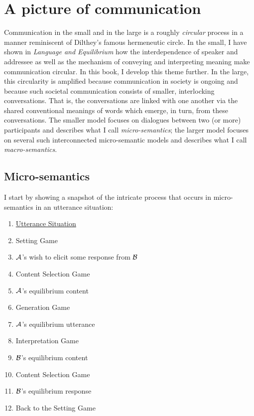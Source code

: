 \chapter{A picture of communication} \label{ch:picture of communication}

Communication in the small and in the large is a roughly \emph{circular} process in a manner reminiscent of Dilthey's famous hermeneutic circle. In the small, I have shown in \emph{Language and Equilibrium} how the interdependence of speaker and addressee as well as the mechanism of conveying and interpreting meaning make communication circular. In this book, I develop this theme further. In the large, this circularity is amplified because communication in society is ongoing and because such societal communication consists of smaller, interlocking conversations. That is, the conversations are linked with one another via the shared conventional meanings of words which emerge, in turn, from these conversations. The smaller model focuses on dialogues between two (or more) participants and describes what I call \emph{micro-semantics}; the larger model focuses on several such interconnected micro-semantic models and describes what I call \emph{macro-semantics}.

\section{Micro-semantics} \label{sec:micro-semantics}

I start by showing a snapshot of the intricate process that occurs in micro-seman\-tics in an utterance situation: 

\begin{enumerate}[itemsep=0pt]
\item[] \underline{Utterance Situation}
\item[] Setting Game
\item[\functionarrow] $\cal A$'s wish to elicit some response from $\cal B$
\item[\functionarrow] Content Selection Game
\item[\functionarrow] $\cal A$'s equilibrium content
\item[\functionarrow] Generation Game
\item[\functionarrow] $\cal A$'s equilibrium utterance
\item[\functionarrow] Interpretation Game
\item[\functionarrow] $\cal B$'s equilibrium content
\item[\functionarrow] Content Selection Game
\item[\functionarrow] $\cal B$'s equilibrium response
\item[\functionarrow] Back to the Setting Game
\end{enumerate}

